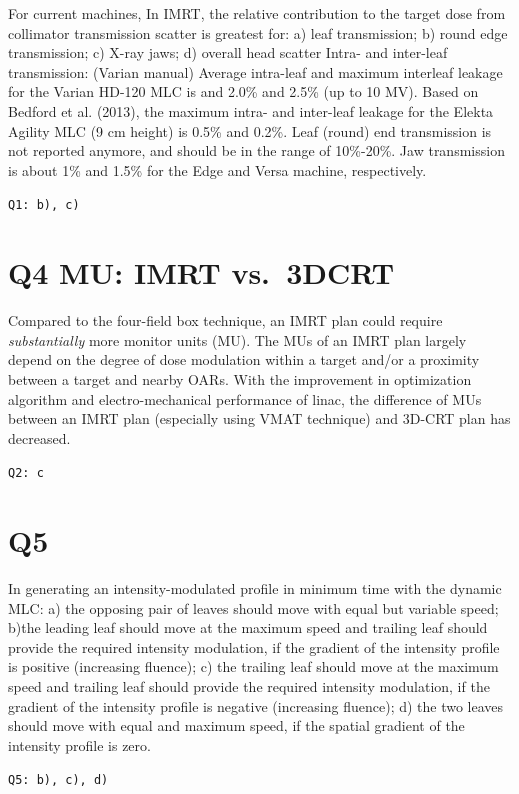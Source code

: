 \documentclass[]{book}
\theoremstyle{definition}
\theoremstyle{definition}
\theoremstyle{definition}
\theoremstyle{remark}
\begin{document}
For current machines, In IMRT, the relative contribution to the target
dose from collimator transmission scatter is greatest for: a) leaf
transmission; b) round edge transmission; c) X-ray jaws; d) overall head
scatter Intra- and inter-leaf transmission: (Varian manual) Average
intra-leaf and maximum interleaf leakage for the Varian HD-120 MLC is
and 2.0\% and 2.5\% (up to 10 MV). Based on Bedford et al. (2013), the
maximum intra- and inter-leaf leakage for the Elekta Agility MLC (9 cm
height) is 0.5\% and 0.2\%. Leaf (round) end transmission is not
reported anymore, and should be in the range of 10\%-20\%. Jaw
transmission is about 1\% and 1.5\% for the Edge and Versa machine,
respectively.

\texttt{Q1:\ b),\ c)}

\section{Q4 MU: IMRT vs.~3DCRT}\label{q4-mu-imrt-vs.3dcrt}

Compared to the four-field box technique, an IMRT plan could require
\emph{substantially} more monitor units (MU). The MUs of an IMRT plan
largely depend on the degree of dose modulation within a target and/or a
proximity between a target and nearby OARs. With the improvement in
optimization algorithm and electro-mechanical performance of linac, the
difference of MUs between an IMRT plan (especially using VMAT technique)
and 3D-CRT plan has decreased.

\texttt{Q2:\ c}

\section{Q5}\label{q5}

In generating an intensity-modulated profile in minimum time with the
dynamic MLC: a) the opposing pair of leaves should move with equal but
variable speed; b)the leading leaf should move at the maximum speed and
trailing leaf should provide the required intensity modulation, if the
gradient of the intensity profile is positive (increasing fluence); c)
the trailing leaf should move at the maximum speed and trailing leaf
should provide the required intensity modulation, if the gradient of the
intensity profile is negative (increasing fluence); d) the two leaves
should move with equal and maximum speed, if the spatial gradient of the
intensity profile is zero.

\texttt{Q5:\ b),\ c),\ d)}
\end{document}
